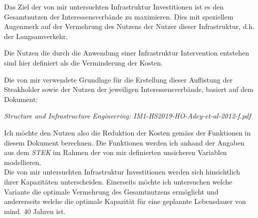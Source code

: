 Das Ziel der von mir untersuchten Infrastruktur Investitionen ist es den Gesamtnutzen der Interessensverbände zu maximieren. \newline Dies mit speziellem Augenmerk auf der Vermehrung des Nutzens der Nutzer dieser Infrastruktur, d.h. der Langsamverkehr. 

Die Nutzen die durch die Anwendung einer Infrastruktur Intervention entstehen sind hier definiert als die Verminderung der Kosten. 

Die von mir verwendete Grundlage für die Erstellung dieser Auflistung der Steakholder sowie der Nutzen der jeweiligen Interessensverbände, basiert auf dem Dokument:


\noindent\hspace*{10mm}\textit{Structure and Infrastructure Engineering: IM1-HS2019-HO-Adey-et-al-2012-f.pdf} 


Ich möchte den Nutzen also die Reduktion der Kosten gemäss der Funktionen in diesem Dokument berechnen. 
Die Funktionen werden ich anhand der Angaben aus dem \textit{STEK} im Rahmen der von mir definierten unsicheren Variablen modellieren. \\ [2ex]
Die von mir untersuchten Infrastruktur Investitionen werden sich hinsichtlich ihrer Kapazitäten unterscheiden. Einerseits möchte ich untersuchen welche Variante die optimale Vermehrung des Gesamtnutzens ermöglicht und andererseits welche die optimale Kapazität für eine geplannte Lebensdauer von mind. 40 Jahren ist. 


%


